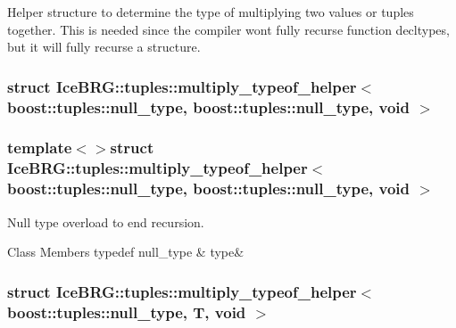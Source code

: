 Helper structure to determine the type of multiplying two values or tuples together. This is needed since the compiler won\textquotesingle{}t fully recurse function decltypes, but it will fully recurse a structure. \label{structIceBRG_1_1tuples_1_1multiply__typeof__helper_3_01boost_1_1tuples_1_1null__type_00_01boost_3879c0d85d6ebd176aeb832142f492bd}
\hypertarget{namespaceIceBRG_1_1tuples_structIceBRG_1_1tuples_1_1multiply__typeof__helper_3_01boost_1_1tuples_1_1null__type_00_01boost_3879c0d85d6ebd176aeb832142f492bd}{}
\subsubsection{struct Ice\+B\+R\+G\+:\+:tuples\+:\+:multiply\+\_\+typeof\+\_\+helper$<$ boost\+:\+:tuples\+:\+:null\+\_\+type, boost\+:\+:tuples\+:\+:null\+\_\+type, void $>$}
\subsubsection*{template$<$$>$struct Ice\+B\+R\+G\+::tuples\+::multiply\+\_\+typeof\+\_\+helper$<$ boost\+::tuples\+::null\+\_\+type, boost\+::tuples\+::null\+\_\+type, void $>$}

Null type overload to end recursion. \begin{DoxyFields}{Class Members}
\hypertarget{namespaceIceBRG_1_1tuples_a7a2232870a048d62eef032f9e00bf7d9}{}typedef null\+\_\+type\label{namespaceIceBRG_1_1tuples_a7a2232870a048d62eef032f9e00bf7d9}
&
type&
\\
\hline

\end{DoxyFields}
\label{structIceBRG_1_1tuples_1_1multiply__typeof__helper_3_01boost_1_1tuples_1_1null__type_00_01T_00_01void_01_4}
\hypertarget{namespaceIceBRG_1_1tuples_structIceBRG_1_1tuples_1_1multiply__typeof__helper_3_01boost_1_1tuples_1_1null__type_00_01T_00_01void_01_4}{}
\subsubsection{struct Ice\+B\+R\+G\+:\+:tuples\+:\+:multiply\+\_\+typeof\+\_\+helper$<$ boost\+:\+:tuples\+:\+:null\+\_\+type, T, void $>$}
